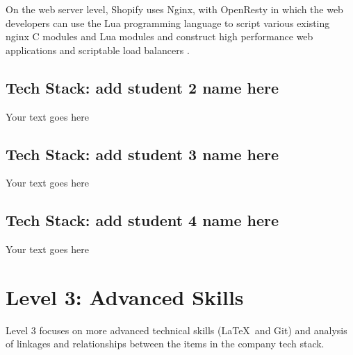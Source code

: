 \documentclass[a4paper, 11pt]{report}
\begin{document}
On the web server level, Shopify uses Nginx, with OpenResty in which the web developers can use the Lua programming language to script various existing nginx C modules and Lua modules and construct high performance web applications and scriptable load balancers \cite{Shatrov2018}.

\subsection{Tech Stack: add student 2 name here}

Your text goes here

\subsection{Tech Stack: add student 3 name here}

Your text goes here

\subsection{Tech Stack: add student 4 name here}

Your text goes here



\newpage
\section{Level 3: Advanced Skills}

Level 3 focuses on more advanced technical skills (\LaTeX\ and Git) and analysis of linkages and relationships between the items in the company tech stack.
\end{document}
